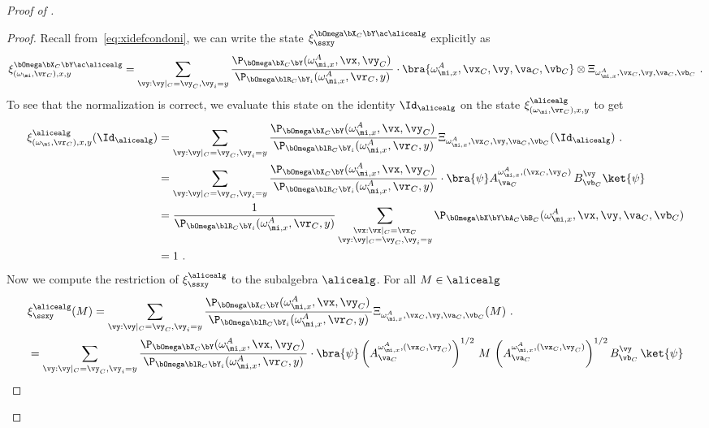\begin{proof}[Proof of ]
	\begin{proof}
		Recall from~\eqref{eq:xidefcondoni}, we can write the state $\xi_\ssxy^{\bOmega \bX_C \bY \ac \alicealg}$ explicitly as
		\begin{equation}
			\xi^{\bOmega \bX_C \bY \ac \alicealg}_{(\omega_\mi, \vr_C), x,y} = \sum_{\vy: \vy|_{C} = \vy_C,  \vy_i = y} \frac{ \P_{\bOmega \bX_C \bY} ( \omega_{\mi,x}^{A},\vx, \vy_C) \,  }{\P_{\bOmega \blR_C \bY_i } ( \omega_{\mi,x}^{A},\vr_C, y) } \cdot \bra{\omega_{\mi,x}^{A}, \vx_C, \vy, \va_C, \vb_C} \otimes \Xi_{\omega_{\mi,x}^{A},\vx_C, \vy,\va_C,\vb_C}~.   \\
		\end{equation}
		To see that the normalization is correct, we evaluate this state on the identity $\Id_{\alicealg}$ on the state $	\xi^{\alicealg}_{(\omega_\mi, \vr_C), x,y}$ to get
		\begin{align*}
			\xi^{\alicealg}_{(\omega_\mi, \vr_C), x,y}(\Id_{\alicealg}) &= \sum_{\vy: \vy|_{C} = \vy_C,  \vy_i = y} \frac{ \P_{\bOmega \bX_C \bY} ( \omega_{\mi,x}^{A},\vx, \vy_C) \,  }{\P_{\bOmega \blR_C \bY_i } ( \omega_{\mi,x}^{A},\vr_C, y) }  \Xi_{\omega_{\mi,x}^{A},\vx_C, \vy,\va_C,\vb_C}(\Id_{\alicealg})~. \\
			&=\sum_{\vy: \vy|_{C} = \vy_C,  \vy_i = y} \frac{ \P_{\bOmega \bX_C \bY} ( \omega_{\mi,x}^{A},\vx, \vy_C) \,  }{\P_{\bOmega \blR_C \bY_i } ( \omega_{\mi,x}^{A},\vr_C, y) } \cdot \bra{\psi} A^{\omega_{\mi,x}^{A}, (\vx_C, \vy_C)}_{\va_C} \, B^\vy_{\vb_C} \ket{\psi} \\
			&= \frac{ 1 }{\P_{\bOmega \blR_C \bY_i }  ( \omega_{\mi,x}^{A},\vr_C, y) } \sum_{\substack{\vx: \vx|_{C} = \vx_C \\ \vy: \vy|_{C} = \vy_C,  \vy_i = y}} \P_{\bOmega \bX \bY  \bA_C \bB_C} ( \omega_{\mi,x}^{A},\vx, \vy, \va_C, \vb_C)  \\
			&= 1~.
		\end{align*}
		Now we compute the restriction of $\xi_\ssxy^{\alicealg}$ to the subalgebra $\alicealg$. For all $M \in \alicealg$
		\begin{align}
			&\notag \xi_\ssxy^{\alicealg}(M) = \sum_{\vy: \vy|_{C} = \vy_C,  \vy_i = y} \frac{ \P_{\bOmega \bX_C \bY} ( \omega_{\mi,x}^{A},\vx, \vy_C) \,  }{\P_{\bOmega \blR_C \bY_i } ( \omega_{\mi,x}^{A},\vr_C, y) }  \Xi_{\omega_{\mi,x}^{A},\vx_C, \vy,\va_C,\vb_C}(M)~. \\
			&= \sum_{\vy: \vy|_{C} = \vy_C,  \vy_i = y} \frac{ \P_{\bOmega \bX_C \bY} ( \omega_{\mi,x}^{A},\vx, \vy_C) \,  }{\P_{\bOmega \blR_C \bY_i } ( \omega_{\mi,x}^{A},\vr_C, y) }  \cdot \bra{\psi} \left (A^{ \omega_{\mi,x}^{A}, (\vx_C, \vy_C)}_{\va_C} \right)^{1/2} \, M \, \left(A^{\omega_{\mi,x}^{A}, (\vx_C, \vy_C)}_{\va_C} \right )^{1/2} B^\vy_{\vb_C} \, \ket{\psi}   \notag \\

\end{align}
\end{proof}
\end{proof}
